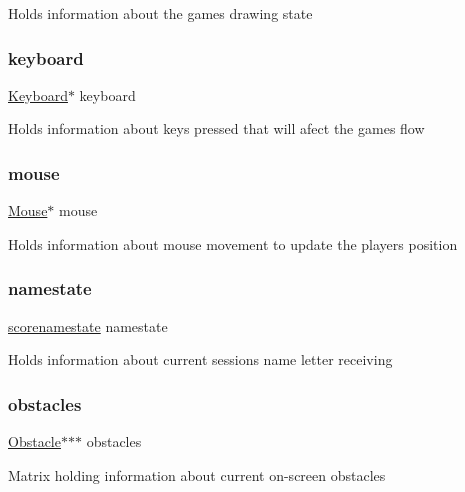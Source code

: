 Holds information about the game\textquotesingle{}s drawing state \hypertarget{struct_game_a945ceeb6236fbaf00dcdb7a0109f0d40}{}\label{struct_game_a945ceeb6236fbaf00dcdb7a0109f0d40} 
\subsubsection{\texorpdfstring{keyboard}{keyboard}}
{\footnotesize\ttfamily \hyperlink{struct_keyboard}{Keyboard}$\ast$ keyboard}

Holds information about keys pressed that will afect the game\textquotesingle{}s flow \hypertarget{struct_game_a2514b83cbae6998a57eae74a24f6faf4}{}\label{struct_game_a2514b83cbae6998a57eae74a24f6faf4} 
\subsubsection{\texorpdfstring{mouse}{mouse}}
{\footnotesize\ttfamily \hyperlink{struct_mouse}{Mouse}$\ast$ mouse}

Holds information about mouse movement to update the player\textquotesingle{}s position \hypertarget{struct_game_a49bcb1da4ed10a863fee60550febc40a}{}\label{struct_game_a49bcb1da4ed10a863fee60550febc40a} 
\subsubsection{\texorpdfstring{namestate}{namestate}}
{\footnotesize\ttfamily \hyperlink{group__game_ga74f568c551e9db616e8fae5ed65be48d}{scorenamestate} namestate}

Holds information about current session\textquotesingle{}s name letter receiving \hypertarget{struct_game_ab4a2d4a1db034550f0e6755c8417f00e}{}\label{struct_game_ab4a2d4a1db034550f0e6755c8417f00e} 
\subsubsection{\texorpdfstring{obstacles}{obstacles}}
{\footnotesize\ttfamily \hyperlink{struct_obstacle}{Obstacle}$\ast$$\ast$$\ast$ obstacles}

Matrix holding information about current on-\/screen obstacles \hypertarget{struct_game_a96781128d3743da3d17e0fdd91afba7b}{}\label{struct_game_a96781128d3743da3d17e0fdd91afba7b} 
